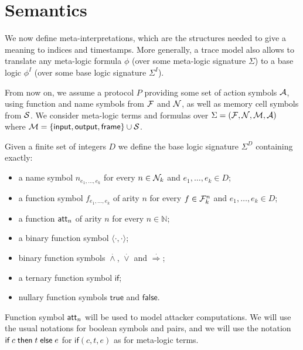 \section{Semantics}

We now define meta-interpretations, which are the structures needed to
give a meaning to indices and timestamps. More generally, a trace model
also allows to translate any meta-logic formula $\phi$
(over some meta-logic signature $\Sigma$)
to a base logic $\phi^I$ (over some base logic signature $\Sigma^I$).


\medskip

From now on, we assume a protocol $P$ providing some set of action
symbols $\mathcal{A}$, using function and name symbols from $\mathcal{F}$ and $\mathcal{N}$,
as well as memory cell symbols from $\mathcal{S}$.
We consider meta-logic terms and formulas over $\Sigma = (\mathcal{F},\mathcal{N},\mathcal{M},\mathcal{A})$
where $\mathcal{M} = \{ \textsf{input}, \textsf{output}, \textsf{frame} \} \cup \mathcal{S}$.

\begin{definition}
  Given a finite set of integers $D$ we define the base logic
  signature $\Sigma^D$ containing exactly:
  \begin{itemize}
    \item a name symbol $n_{e_1,\ldots,e_k}$ for every $n \in \mathcal{N}_k$
       and $e_1,\ldots,e_k \in D$;
    \item a function symbol $f_{e_1,\ldots,e_k}$ of arity $n$ for every
      $f \in \mathcal{F}_k^n$ and $e_1,\ldots,e_k \in D$;
    \item a function $\mathsf{att}_n$ of arity $n$ for every $n\in\mathbb{N}$;
    \item a binary function symbol $\langle \cdot , \cdot \rangle$;
    \item binary function symbols
      $\stackrel{.}{\wedge}$, $\stackrel{.}{\vee}$ and
      $\stackrel{.}{\Rightarrow}$;
    \item a ternary function symbol $\mathsf{if}$;
    \item nullary function symbols $\mathsf{true}$ and $\mathsf{false}$.
  \end{itemize}
  Function symbol $\mathsf{att}_n$ will be used to model attacker computations.
  We will use the usual notations for boolean symbols and pairs,
  and we will use the notation $\textsf{if}\; c \;\textsf{then}\; t \;\textsf{else}\; e$
  for $\mathsf{if}(c,t,e)$ as for meta-logic terms.
\end{definition}

